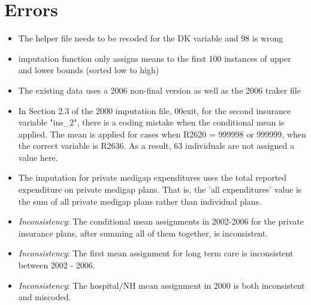 \documentclass[12pt]{article}
\begin{document}
	\section{Errors}\label{s:errors}
	\begin{itemize}
		\item The helper file needs to be recoded for the DK variable and 98 is wrong
		\item imputation function only assigns means to the first 100 instances of upper and lower bounds (sorted low to high)
		\item The existing data uses a 2006 non-final version as well as the 2006 traker file
		\item In Section 2.3 of the 2000 imputation file, 00exit, for the second insurance variable "ins\_2", there is a coding mistake when the conditional mean is applied. The mean is applied for cases when R2620 = 999998 or 999999, when the correct variable is R2636. As a result, 63 individuals are not assigned a value here.
		\item The imputation for private medigap expenditures uses the total reported expenditure on private medigap plans. That is, the 'all expenditures' value is the sum of all private medigap plans rather than individual plans.
		\item \textit{Inconsistency}: The conditional mean assignments in 2002-2006 for the private insurance plans, after summing all of them together, is inconsistent. 
		\item \textit{Inconsistency}: The first mean assignment for long term care is inconsistent between 2002 - 2006.
		\item \textit{Inconsistency}: The hospital/NH mean assignment in 2000 is both inconsistent and miscoded. 
	\end{itemize}
\end{document}
